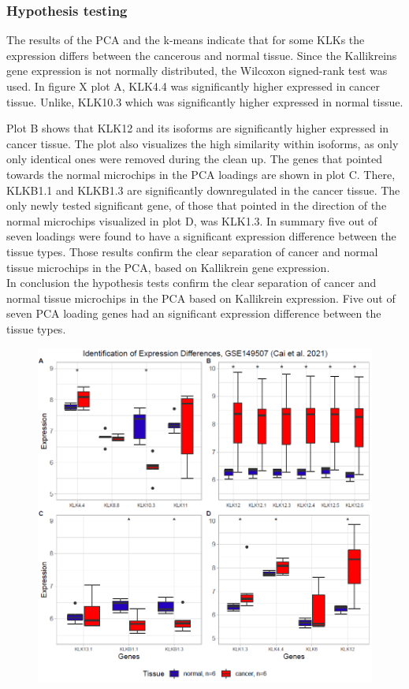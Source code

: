 \documentclass[
]{article}
\begin{document}
\hypertarget{hypothesis-testing-1}{%
\subsubsection{Hypothesis testing}\label{hypothesis-testing-1}}

The results of the PCA and the k-means indicate that for some KLKs the
expression differs between the cancerous and normal tissue. Since the
Kallikreins gene expression is not normally distributed, the Wilcoxon
signed-rank test was used. In figure X plot A, KLK4.4 was significantly
higher expressed in cancer tissue. Unlike, KLK10.3 which was
significantly higher expressed in normal tissue.

Plot B shows that KLK12 and its isoforms are significantly higher
expressed in cancer tissue. The plot also visualizes the high similarity
within isoforms, as only only identical ones were removed during the
clean up. The genes that pointed towards the normal microchips in the
PCA loadings are shown in plot C. There, KLKB1.1 and KLKB1.3 are
significantly downregulated in the cancer tissue. The only newly tested
significant gene, of those that pointed in the direction of the normal
microchips visualized in plot D, was KLK1.3. In summary five out of
seven loadings were found to have a significant expression difference
between the tissue types. Those results confirm the clear separation of
cancer and normal tissue microchips in the PCA, based on Kallikrein gene
expression.\\
In conclusion the hypothesis tests confirm the clear separation of
cancer and normal tissue microchips in the PCA based on Kallikrein
expression. Five out of seven PCA loading genes had an significant
expression difference between the tissue types.

\begin{figure}

{\centering \includegraphics[width=0.5\linewidth]{images/Expr_diff_kmeans_PCA_lung} 

}

\end{figure}
\end{document}
